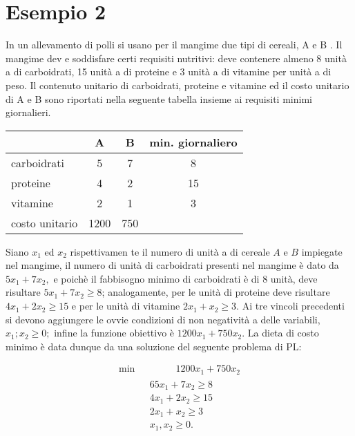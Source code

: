 \documentclass[a4paper,11pt]{article}
\begin{document}
\section*{Esempio 2}
In un allevamento di polli
si usano per il mangime
due tipi
di cereali,
A
e
B
. Il mangime
dev
e soddisfare
certi
requisiti
nutritivi:
deve contenere
almeno
8 unità
a di carboidrati,
15
unità
a di proteine
e 3 unità
a di vitamine
per unità
a di peso.
Il contenuto
unitario
di
carboidrati,
proteine
e vitamine
ed il costo
unitario
di
A
e
B
sono
riportati
nella
seguente
tabella
insieme
ai requisiti
minimi
giornalieri.
\begin{center}
\begin{tabular}{l*{3}{c}}
	
	& A & B & min. giornaliero \\
	\midrule
	carboidrati & 5 & 7 & 8 \\
	proteine & 4 & 2 & 15 \\
	vitamine & 2 & 1 & 3 \\
	costo unitario & 1200 & 750 & \\
	
\end{tabular}
\end{center}

Siano $x_1$ ed $x_2$ rispettivamen
te il numero
di unità
a di cereale
$A$
e
$B$
impiegate
nel
mangime,
il numero di unità di carboidrati
presenti nel
mangime è dato
da
$5x_1+7x_2,$
e poichè il fabbisogno
minimo
di carboidrati
è di 8 unità, deve risultare
$5x_1+7x_2 \geq 8$; analogamente,
per le unità di proteine
deve risultare
$4x_1
+ 2x_2 \geq
15$
e per le unità di
vitamine
$2x_1
+
x_2 \geq 3.$ Ai
tre
vincoli
precedenti si devono
aggiungere
le ovvie
condizioni
di non
negatività
a delle
variabili,
$x_1
; x_2 \geq 0;$ infine
la funzione
obiettivo è $1200x_1+ 750x_2.$
La
dieta
di costo
minimo è data
dunque
da
una
soluzione
del
seguente problema
di
PL:

\begin{equation}\begin{split}
\text{min}\qquad\qquad\ 1200x_1+750x_2\\
\text{} \qquad
\begin{split} 
&65x_1+7x_2\geq 8\\
&4x_1+2x_2\geq 15\\
&2x_1+x_2 \geq 3 \\
&x_1,x_2\geq0.
\end{split}
\end{split}
\end{equation}
\end{document}
